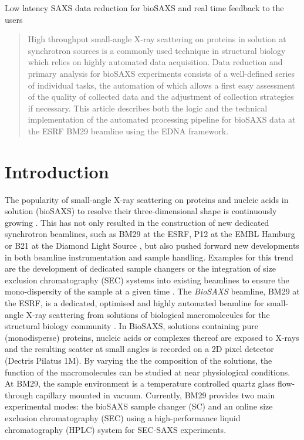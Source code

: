 \documentclass[preprint,pdf]{iucr}              %
\begin{document}

\maketitle                        %

\begin{synopsis}
Low latency SAXS data reduction for bioSAXS and real time feedback to the users
\end{synopsis}

\begin{abstract}
High throughput small-angle X-ray scattering on proteins in solution at
synchrotron sources is a commonly used technique in structural biology which
relies on highly automated data acquisition.
Data reduction and primary analysis for bioSAXS experiments consists of a
well-defined series of individual tasks, the automation of which allows a first
easy assessment of the quality of collected data and the adjustment of
collection strategies if necessary. 
This article describes both the logic and the technical implementation of the
automated processing pipeline for bioSAXS data at the ESRF BM29 beamline using
the EDNA framework.
\end{abstract}


\section{Introduction}
The popularity of small-angle X-ray scattering on proteins and nucleic acids in
solution (bioSAXS) to resolve their three-dimensional shape is continuously
growing \cite{Graewert2013,Hura2009,Reyes2014}.
This has not only resulted in the construction of new dedicated
synchrotron beamlines, such as BM29 at the ESRF, P12 at the EMBL Hamburg or B21
at the Diamond Light Source \cite{BM29paper,P12,B21},
but also pushed forward new developments in both beamline instrumentation and sample handling.
Examples for this trend are the development of dedicated sample changers
\cite{SCpaper,SCchess,SCtainer2009,SCslac} or the integration of size
exclusion chromatography (SEC) systems into existing beamlines to ensure the 
mono-dispersity of the sample at a given time \cite{SECPaper2012,SECP12,SECSWING,SECbiocat}.
The \textit{BioSAXS} beamline, BM29 at the ESRF, is a dedicated, optimised and 
highly automated beamline for small-angle X-ray scattering from solutions of 
biological macromolecules for the structural biology community \cite{BM29paper}. 
In BioSAXS, solutions containing pure (monodisperse) proteins, nucleic acids or 
complexes thereof are exposed to X-rays and the resulting scatter at small 
angles is recorded on a 2D pixel detector (Dectris Pilatus 1M).   
By varying the the composition of the solutions, the function of the macromolecules 
can be studied at near physiological conditions.
At BM29, the sample environment is a temperature controlled quartz glass flow-through 
capillary mounted in vacuum.
Currently, BM29 provides two main experimental modes: the bioSAXS sample changer (SC) \cite{SCpaper} 
and an online size exclusion chromatography (SEC) using a high-performance 
liquid chromatography (HPLC) system  for SEC-SAXS experiments.
\end{document}
